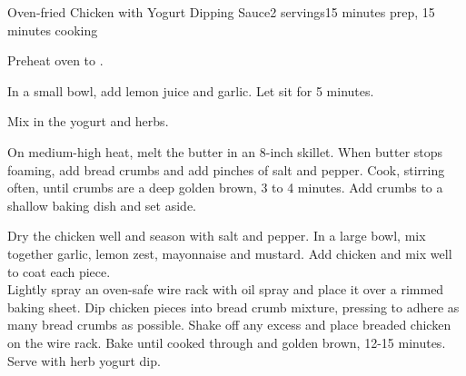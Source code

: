 \documentclass[../Cookbook.tex]{subfiles}
\begin{document}
\begin{recipe}{Oven-fried Chicken with Yogurt Dipping Sauce}{2 servings}{15 minutes prep, 15 minutes cooking}

Preheat oven to .

In a small bowl, add lemon juice and garlic. Let sit for 5 minutes.

Mix in the yogurt and herbs.

On medium-high heat, melt the butter in an 8-inch skillet. When butter stops foaming, add bread crumbs and add pinches of salt and pepper. Cook, stirring often, until crumbs are a deep golden brown, 3 to 4 minutes. Add crumbs to a shallow baking dish and set aside.

Dry the chicken well and season with salt and pepper. In a large bowl, mix together garlic, lemon zest, mayonnaise and mustard. Add chicken and mix well to coat each piece.\\
Lightly spray an oven-safe wire rack with oil spray and place it over a rimmed baking sheet. Dip chicken pieces into bread crumb mixture, pressing to adhere as many bread crumbs as possible. Shake off any excess and place breaded chicken on the wire rack. Bake until cooked through and golden brown, 12-15 minutes. Serve with herb yogurt dip.


\end{recipe}
\end{document}
